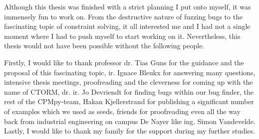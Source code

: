 \documentclass[master=cws, masteroption=se, english, oneside]{kulemt} %
\begin{document}
\begin{preface}
Although this thesis was finished with a strict planning I put onto myself, it was immensely fun to work on. From the destructive nature of fuzzing bugs to the fascinating topic of constraint solving, it all interested me and I had not a single moment where I had to push myself to start working on it. Nevertheless, this thesis would not have been possible without the following people.


\noindent Firstly, I would like to thank 
professor dr. Tias Guns for the guidance and the proposal of this fascinating topic,
ir. Ignace Bleukx for answering many questions, intensive thesis meetings, proofreading and the cleverness for coming up with the name of CTORM, 
dr. ir. Jo Devriendt for finding bugs within our bug finder, 
the rest of the CPMpy-team, 
Hakan Kjellerstrand for publishing a significant number of examples which we used as seeds,
friends for proofreading even all the way back from industrial engineering on campus De Nayer like ing. Simon Vandevelde.
Lastly, I would like to thank my family for the support during my further studies.
\end{preface}

\tableofcontents*
\setcounter{tocdepth}{5} %
\end{document}
